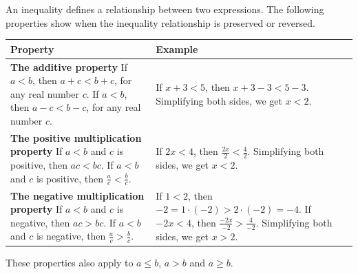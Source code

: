 \documentclass[en,12pt]{elegantbook}
\newenvironment{rmdnote}{
    \par\noindent
    \makebox[-\width][r]{
    \tiny\color{red!90}
    \textdbend
    \hspace*{2pt}
    }
    \makebox[\width][l]{
        \hspace*{3pt}
        \textbf{
            \color{second}
            Note 
        }
    }
    \begin{shaded}
    \itshape
}{
    \par
    \end{shaded}
}
\begin{document}
An inequality defines a relationship between two expressions. The following properties show when the inequality relationship is preserved or reversed.

\begin{longtable}[]{@{}ll@{}}
\toprule
\begin{minipage}[b]{0.47\columnwidth}\raggedright
Property\strut
\end{minipage} & \begin{minipage}[b]{0.47\columnwidth}\raggedright
Example\strut
\end{minipage}\tabularnewline
\midrule
\endhead
\begin{minipage}[t]{0.47\columnwidth}\raggedright
\textbf{The additive property} If \(a<b\), then \(a+c<b+c\), for any real number \(c\). If \(a<b\), then \(a-c<b-c\), for any real number \(c\).\strut
\end{minipage} & \begin{minipage}[t]{0.47\columnwidth}\raggedright
If \(x+3<5\), then \(x+3-3<5-3\). Simplifying both sides, we get \(x<2\).\strut
\end{minipage}\tabularnewline
\begin{minipage}[t]{0.47\columnwidth}\raggedright
\textbf{The positive multiplication property} If \(a<b\) and \(c\) is positive, then \(ac<bc\). If \(a<b\) and \(c\) is positive, then \(\frac ac<\frac bc\).\strut
\end{minipage} & \begin{minipage}[t]{0.47\columnwidth}\raggedright
If \(2x<4\), then \(\frac{2x}{2}<\frac{4}{2}\). Simplifying both sides, we get \(x<2\).\strut
\end{minipage}\tabularnewline
\begin{minipage}[t]{0.47\columnwidth}\raggedright
\textbf{The negative multiplication property} If \(a<b\) and \(c\) is negative, then \(ac>bc\). If \(a<b\) and \(c\) is negative, then \(\frac ac>\frac bc\).\strut
\end{minipage} & \begin{minipage}[t]{0.47\columnwidth}\raggedright
If \(1<2\), then \(-2=1\cdot(-2)>2\cdot(-2)=-4\). If \(-2x<4\), then \(\frac{-2x}{-2}>\frac{4}{-2}\). Simplifying both sides, we get \(x>2\).\strut
\end{minipage}\tabularnewline
\bottomrule
\end{longtable}

\begin{rmdnote}

These properties also apply to \(a\leq b\), \(a>b\) and \(a\geq b\).

\end{rmdnote}
\end{document}
